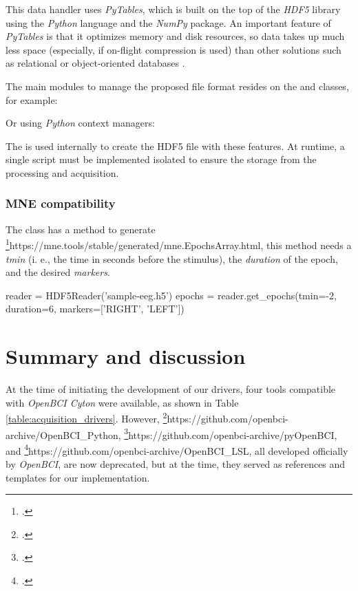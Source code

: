 This data handler uses \textit{PyTables}, which is built on the top of the \textit{HDF5} library using the \textit{Python} language and the \textit{NumPy} package. An important feature of \textit{PyTables} is that it optimizes memory and disk resources, so data takes up much less space (especially, if on-flight compression is used) than other solutions such as relational or object-oriented databases \cite{Welcomet25:online}.

The main modules to manage the proposed file format resides on the  and  classes, for example:



Or using \textit{Python} context managers:



The  is used internally to create the \gls*{HDF}5 file with these features. At runtime, a single script must be implemented isolated to ensure the storage from the processing and acquisition.

\subsubsection{MNE compatibility}

The  class has a method to generate \footcite{mne.EpochsArray}{https://mne.tools/stable/generated/mne.EpochsArray.html}, this method needs a \textit{tmin} (i. e., the time in seconds before the stimulus), the \textit{duration} of the epoch, and the desired \textit{markers}.

\begin{python}
reader = HDF5Reader('sample-eeg.h5')
epochs = reader.get_epochs(tmin=-2, duration=6, markers=['RIGHT', 'LEFT'])
\end{python}

\section{Summary and discussion}



At the time of initiating the development of our drivers, four tools compatible with \textit{OpenBCI Cyton} were available, as shown in Table \ref{table:acquisition_drivers}. However, \footcite{OpenBCI Python}{https://github.com/openbci-archive/OpenBCI\_Python}, \footcite{pyOpenBCI}{https://github.com/openbci-archive/pyOpenBCI}, and \footcite{OpenBCI LSL}{https://github.com/openbci-archive/OpenBCI\_LSL}, all developed officially by \textit{OpenBCI}, are now deprecated, but at the time, they served as references and templates for our implementation. 

